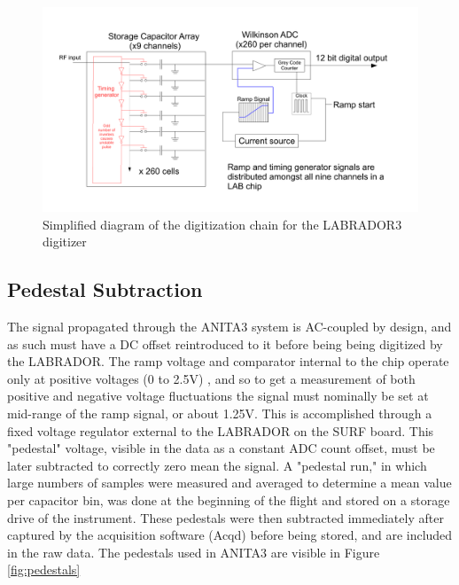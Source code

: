 \begin{figure}
	\includegraphics[width=\textwidth]{figures/LAB_Digitization}
	\caption{Simplified diagram of the digitization chain for the LABRADOR3 digitizer}
	\label{fig:Lab_Digitization}
\end{figure}	
		


	\subsection{Pedestal Subtraction}
		The signal propagated through the ANITA3 system is AC-coupled by design, and as such must have a DC offset reintroduced to it before being being digitized by the LABRADOR.  The ramp voltage and comparator internal to the chip operate only at positive voltages (0 to 2.5V) , and so to get a measurement of both positive and negative voltage fluctuations the signal must nominally be set at mid-range of the ramp signal, or about 1.25V.  This is accomplished through a fixed voltage regulator external to the LABRADOR on the SURF board.  This "pedestal" voltage, visible in the data as a constant ADC count offset, must be later subtracted to correctly zero mean the signal.  A "pedestal run," in which large numbers of samples were measured and averaged to determine a mean value per capacitor bin, was done at the beginning of the flight and stored on a storage drive of the instrument.  These pedestals were then subtracted immediately after captured by the acquisition software (Acqd) before being stored, and are included in the raw data.  The pedestals used in ANITA3 are visible in Figure \ref{fig:pedestals}
		
